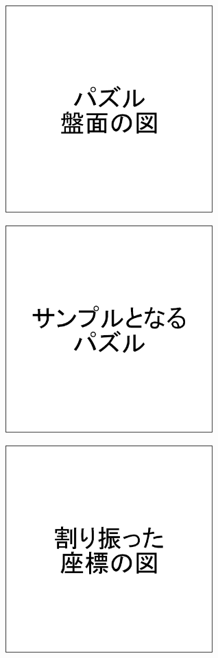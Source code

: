 \begin{clearpagefigure}
  \includegraphics[width=8cm,clip]{fig/board.png}
  \caption{}
  \label{fig:Board}
\end{clearpagefigure}

\begin{clearpagefigure}
  \includegraphics[width=8cm,clip]{fig/samplePuzzle.png}
  \caption{}
  \label{fig:SamplePuzzle}
\end{clearpagefigure}

\begin{clearpagefigure}
  \includegraphics[width=8cm,clip]{fig/coordinate.png}
  \caption{}
  \label{fig:Coordinate}
\end{clearpagefigure}

